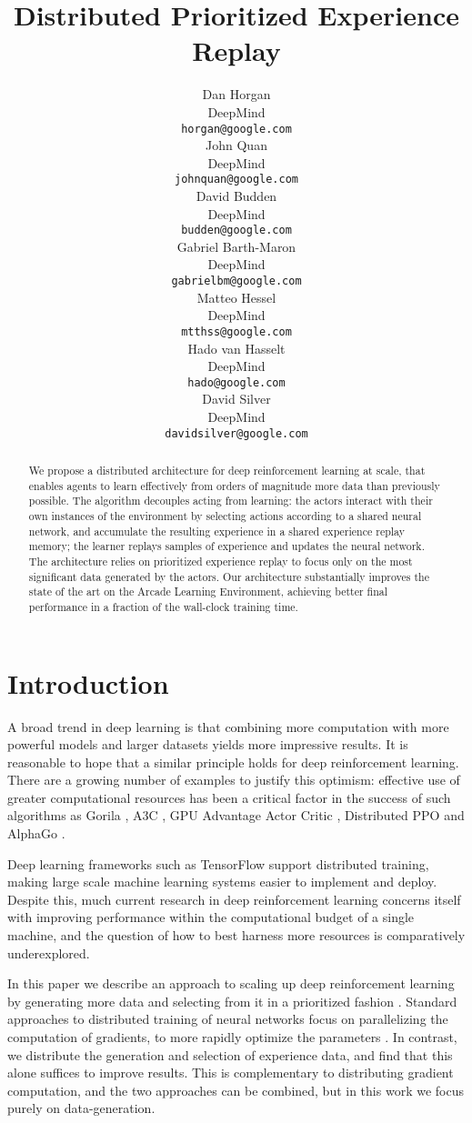 \documentclass{article} \PassOptionsToPackage{usenames,dvipsnames}{xcolor}
\title{Distributed Prioritized Experience Replay}
\author{Dan Horgan \\
DeepMind \\
\texttt{horgan@google.com} \\
\And
John Quan \\
DeepMind \\
\texttt{johnquan@google.com} \\
\And
David Budden \\
DeepMind \\
\texttt{budden@google.com} \\
\And
Gabriel Barth-Maron \\
DeepMind \\
\texttt{gabrielbm@google.com} \\
\And
Matteo Hessel \\
DeepMind \\
\texttt{mtthss@google.com} \\
\And
Hado van Hasselt \\
DeepMind \\
\texttt{hado@google.com} \\
\And
David Silver \\
DeepMind \\
\texttt{davidsilver@google.com} \\
}
\begin{document}
\maketitle

\begin{abstract}
We propose a distributed architecture for deep reinforcement learning at scale, that enables agents to learn effectively from orders of magnitude more data than previously possible. The algorithm decouples acting from learning: the actors interact with their own instances of the environment by selecting actions according to a shared neural network, and accumulate the resulting experience in a shared experience replay memory; the learner replays samples of experience and updates the neural network. The architecture relies on prioritized experience replay to focus only on the most significant data generated by the actors. Our architecture substantially improves the state of the art on the Arcade Learning Environment, achieving better final performance in a fraction of the wall-clock training time.
\end{abstract}


\section{Introduction}
A broad trend in deep learning is that combining more computation \citep{Dean:2012:LSD:2999134.2999271} with more powerful models \citep{DBLP:journals/corr/KaiserGSVPJU17} and larger datasets \citep{imagenet_cvpr09} yields more impressive results. It is reasonable to hope that a similar principle holds for deep reinforcement learning. There are a growing number of examples to justify this optimism: effective use of greater computational resources has been a critical factor in the success of such algorithms as Gorila \citep{gorila}, A3C \citep{a3c}, GPU Advantage Actor Critic \citep{ga3c}, Distributed PPO \citep{heess:dppo} and AlphaGo \citep{alphago}.

Deep learning frameworks such as TensorFlow \citep{tensorflow} support distributed training, making large scale machine learning systems easier to implement and deploy. Despite this, much current research in deep reinforcement learning concerns itself with improving performance within the computational budget of a single machine, and the question of how to best harness more resources is comparatively underexplored.

In this paper we describe an approach to scaling up deep reinforcement learning by generating more data and selecting from it in a prioritized fashion \citep{prioritized-replay}. Standard approaches to distributed training of neural networks focus on parallelizing the computation of gradients, to more rapidly optimize the parameters \citep{Dean:2012:LSD:2999134.2999271}. In contrast, we distribute the generation and selection of experience data, and find that this alone suffices to improve results. This is complementary to distributing gradient computation, and the two approaches can be combined, but in this work we focus purely on data-generation.
\end{document}
